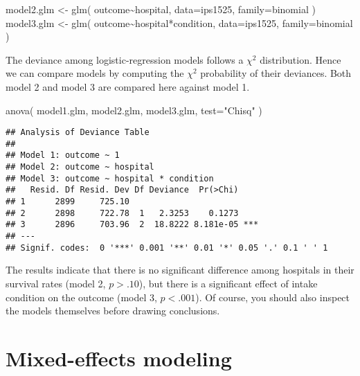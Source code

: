 \documentclass[
]{book}
\newenvironment{Shaded}{\begin{snugshade}}{\end{snugshade}}
\newcommand{\AttributeTok}[1]{\textcolor[rgb]{0.77,0.63,0.00}{#1}}
\newcommand{\FunctionTok}[1]{\textcolor[rgb]{0.00,0.00,0.00}{#1}}
\newcommand{\NormalTok}[1]{#1}
\newcommand{\OtherTok}[1]{\textcolor[rgb]{0.56,0.35,0.01}{#1}}
\newcommand{\SpecialCharTok}[1]{\textcolor[rgb]{0.00,0.00,0.00}{#1}}
\newcommand{\StringTok}[1]{\textcolor[rgb]{0.31,0.60,0.02}{#1}}
\begin{document}
\begin{Shaded}
\begin{Highlighting}[]
\NormalTok{model2.glm }\OtherTok{\textless{}{-}} \FunctionTok{glm}\NormalTok{( outcome}\SpecialCharTok{\textasciitilde{}}\NormalTok{hospital, }\AttributeTok{data=}\NormalTok{ips1525, }\AttributeTok{family=}\NormalTok{binomial ) }
\NormalTok{model3.glm }\OtherTok{\textless{}{-}} \FunctionTok{glm}\NormalTok{( outcome}\SpecialCharTok{\textasciitilde{}}\NormalTok{hospital}\SpecialCharTok{*}\NormalTok{condition, }
                   \AttributeTok{data=}\NormalTok{ips1525, }\AttributeTok{family=}\NormalTok{binomial ) }
\end{Highlighting}
\end{Shaded}

The deviance among logistic-regression models follows a \(\chi^2\)
distribution. Hence we can compare models by computing the \(\chi^2\)
probability of their deviances. Both model 2 and model 3
are compared here against model 1.

\begin{Shaded}
\begin{Highlighting}[]
\FunctionTok{anova}\NormalTok{( model1.glm, model2.glm, model3.glm, }\AttributeTok{test=}\StringTok{"Chisq"}\NormalTok{ ) }
\end{Highlighting}
\end{Shaded}

\begin{verbatim}
## Analysis of Deviance Table
## 
## Model 1: outcome ~ 1
## Model 2: outcome ~ hospital
## Model 3: outcome ~ hospital * condition
##   Resid. Df Resid. Dev Df Deviance  Pr(>Chi)    
## 1      2899     725.10                          
## 2      2898     722.78  1   2.3253    0.1273    
## 3      2896     703.96  2  18.8222 8.181e-05 ***
## ---
## Signif. codes:  0 '***' 0.001 '**' 0.01 '*' 0.05 '.' 0.1 ' ' 1
\end{verbatim}

The results indicate that there is no significant difference among
hospitals in their survival rates (model 2, \(p>.10\)), but there is a
significant effect of intake condition on the outcome (model 3,
\(p<.001\)). Of course, you should also inspect the models themselves
before drawing conclusions.

\hypertarget{ch-mixedeffects}{%
\chapter{Mixed-effects modeling}\label{ch-mixedeffects}}
\end{document}
